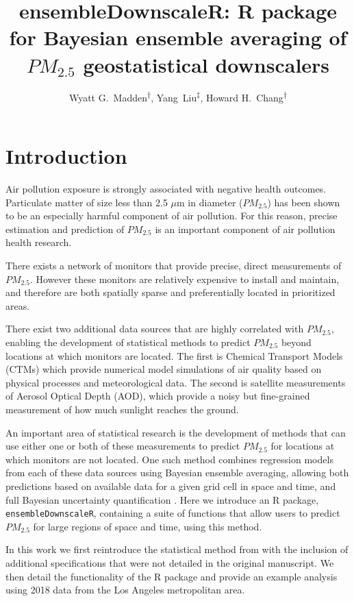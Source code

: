 \documentclass[12pt]{article}
\title{ensembleDownscaleR: R package for Bayesian ensemble averaging of $PM_{2.5}$ geostatistical downscalers}
\author{Wyatt G.\relax ~Madden\textsuperscript{$\dagger$}, Yang\relax ~Liu\textsuperscript{$\ddagger$}, Howard H.\relax ~Chang\textsuperscript{$\dagger$}}
\date{}
\begin{document}
\maketitle

\section*{Introduction}

Air pollution exposure is strongly associated with negative health outcomes. 
Particulate matter of size less than 2.5 $\mu$m in diameter ($PM_{2.5}$) has been shown to be an especially harmful component of air pollution. 
For this reason, precise estimation and prediction of $PM_{2.5}$ is an important component of air pollution health research.  

There exists a network of monitors that provide precise, direct measurements of $PM_{2.5}$. 
However these monitors are relatively expensive to install and maintain, and therefore are both spatially sparse and preferentially located in prioritized areas. 

There exist two additional data sources that are highly correlated with $PM_{2.5}$, enabling the development of statistical methods to predict $PM_{2.5}$ beyond locations at which monitors are located. 
The first is Chemical Transport Models (CTMs) which provide numerical model simulations of air quality based on physical processes and meteorological data. 
The second is satellite measurements of Aerosol Optical Depth (AOD), which provide a noisy but fine-grained measurement of how much sunlight reaches the ground. 



An important area of statistical research is the development of methods that can use either one or both of these measurements to predict $PM_{2.5}$ for locations at which monitors are not located. 
One such method combines regression models from each of these data sources using Bayesian ensemble averaging, allowing both predictions based on available data for a given grid cell in space and time, and full Bayesian uncertainty quantification \cite{murray2019}. 
Here we introduce an R package, \texttt{ensembleDownscaleR}, containing a suite of functions that allow users to predict $PM_{2.5}$ for large regions of space and time, using this method.

In this work we first reintroduce the statistical method from \cite{murray2019} with the inclusion of additional specifications that were not detailed in the original manuscript. 
We then detail the functionality of the R package and provide an example analysis using 2018 data from the Los Angeles metropolitan area. 
\end{document}
